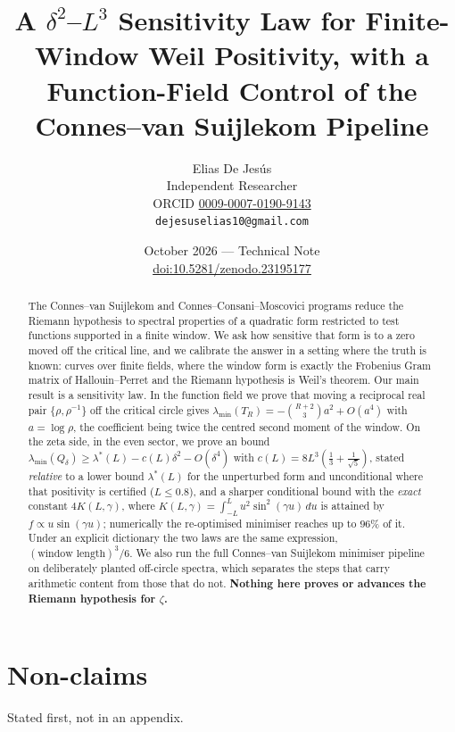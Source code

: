 \documentclass[11pt,a4paper]{article}
\title{\bfseries A $\delta^2$--$L^3$ Sensitivity Law for Finite-Window Weil
Positivity, with a Function-Field Control of the Connes--van Suijlekom Pipeline}
\author{Elias De Jes\'us\\[2pt]
{\small Independent Researcher}\\[1pt]
{\small ORCID \href{https://orcid.org/0009-0007-0190-9143}{0009-0007-0190-9143}}\\[1pt]
{\small \texttt{dejesuselias10@gmail.com}}}
\date{October 2026 --- Technical Note\\[2pt]
{\small\href{https://doi.org/10.5281/zenodo.23195177}{doi:10.5281/zenodo.23195177}}}
\theoremstyle{definition}
\theoremstyle{remark}
\newcommand{\T}{T_R}
\newcommand{\lmin}{\lambda_{\min}}
\newcommand{\lstar}{\lambda^{*}}
\begin{document}
\maketitle

\begin{abstract}
\noindent
The Connes--van Suijlekom and Connes--Consani--Moscovici programs reduce the Riemann
hypothesis to spectral properties of a quadratic form restricted to test functions
supported in a finite window. We ask how sensitive that form is to a zero moved off the
critical line, and we calibrate the answer in a setting where the truth is known: curves
over finite fields, where the window form is exactly the Frobenius Gram matrix of
Hallouin--Perret and the Riemann hypothesis is Weil's theorem. Our main result is a
sensitivity law. In the function field we prove that moving a reciprocal real pair
$\{\rho,\rho^{-1}\}$ off the critical circle gives
$\lmin(\T)=-\binom{R+2}{3}a^{2}+O(a^{4})$ with $a=\log\rho$, the coefficient being twice
the centred second moment of the window. On the zeta side, in the even sector, we prove an
bound $\lmin(Q_\delta)\ge\lstar(L)-c(L)\delta^{2}-O(\delta^{4})$ with
$c(L)=8L^{3}(\tfrac13+\tfrac1{\sqrt5})$, stated \emph{relative} to a lower bound $\lstar(L)$ for
the unperturbed form and unconditional where that positivity is certified ($L\le0.8$), and
a sharper conditional bound with the \emph{exact} constant $4K(L,\gamma)$, where
$K(L,\gamma)=\int_{-L}^{L}u^{2}\sin^{2}(\gamma u)\,du$ is attained by
$f\propto u\sin(\gamma u)$; numerically the re-optimised minimiser reaches up to $96\%$ of
it. Under an explicit dictionary the two laws are the same expression,
$(\text{window length})^{3}/6$. We also run the full Connes--van Suijlekom minimiser
pipeline on deliberately planted off-circle spectra, which separates the steps that carry
arithmetic content from those that do not.
\textbf{Nothing here proves or advances the Riemann hypothesis for $\zeta$.}
\end{abstract}

\section*{Non-claims}

Stated first, not in an appendix.
\end{document}
